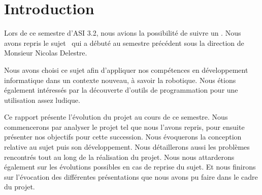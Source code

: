 \section{Introduction}
\label{sec:Introduction}

\par Lors de ce semestre d'ASI 3.2, nous avions la possibilité de suivre un \pao.
Nous avons repris le sujet \projet\ qui a débuté au semestre précédent sous la direction de Monsieur Nicolas Delestre.

\par Nous avons choisi ce sujet afin d'appliquer nos compétences en développement informatique dans un contexte nouveau, à savoir la robotique.
Nous étions également intéressés par la découverte d'outils de programmation pour une utilisation assez ludique.

\par Ce rapport présente l'évolution du projet au cours de ce semestre.
Nous commencerons par analyser le projet tel que nous l'avons repris, pour ensuite présenter nos objectifs pour cette succession.
Nous évoquerons la conception relative au sujet puis son développement. Nous détaillerons aussi les problèmes rencontrés tout au long de la réalisation du projet.
Nous nous attarderons également sur les évolutions possibles en cas de reprise du sujet.
Et nous finirons sur l'évocation des différentes présentations que nous avons pu faire dans le cadre du projet.

\pagebreak
